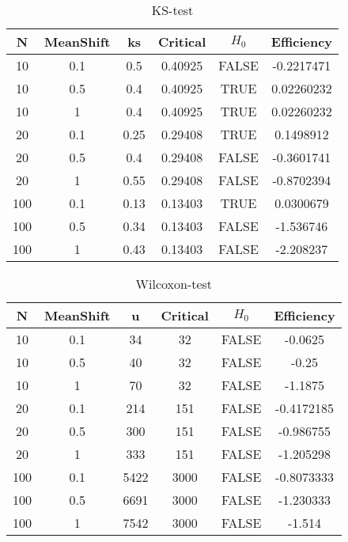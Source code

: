 \documentclass{article} %
\begin{document}
\begin{table}[H]
\centering
\begin{tabular}{|c|c|c|c|c|c|}
\hline
\textbf{N} & \textbf{MeanShift} & \textbf{ks} &
\textbf{Critical} & \textbf{$H_0$} & \textbf{Efficiency} \\ \hline
10  & 0.1       & 0.5  & 0.40925  & FALSE & -0.2217471 \\ \hline
10  & 0.5       & 0.4  & 0.40925  & TRUE  & 0.02260232 \\ \hline
10  & 1         & 0.4  & 0.40925  & TRUE  & 0.02260232 \\ \hline
20  & 0.1       & 0.25 & 0.29408  & TRUE  & 0.1498912  \\ \hline
20  & 0.5       & 0.4  & 0.29408  & FALSE & -0.3601741 \\ \hline
20  & 1         & 0.55 & 0.29408  & FALSE & -0.8702394 \\ \hline
100 & 0.1       & 0.13 & 0.13403  & TRUE  & 0.0300679  \\ \hline
100 & 0.5       & 0.34 & 0.13403  & FALSE & -1.536746  \\ \hline
100 & 1         & 0.43 & 0.13403  & FALSE & -2.208237  \\ \hline
\end{tabular}
\caption{KS-test}
\end{table}

\begin{table}[H]
\centering
\begin{tabular}{|c|c|c|c|c|c|}
\hline
\textbf{N} & \textbf{MeanShift} & \textbf{u} &
\textbf{Critical} & \textbf{$H_0$} & \textbf{Efficiency} \\ \hline
10  & 0.1       & 34   & 32       & FALSE & -0.0625    \\ \hline
10  & 0.5       & 40   & 32       & FALSE & -0.25      \\ \hline
10  & 1         & 70   & 32       & FALSE & -1.1875    \\ \hline
20  & 0.1       & 214  & 151      & FALSE & -0.4172185 \\ \hline
20  & 0.5       & 300  & 151      & FALSE & -0.986755  \\ \hline
20  & 1         & 333  & 151      & FALSE & -1.205298  \\ \hline
100 & 0.1       & 5422 & 3000     & FALSE & -0.8073333 \\ \hline
100 & 0.5       & 6691 & 3000     & FALSE & -1.230333  \\ \hline
100 & 1         & 7542 & 3000     & FALSE & -1.514     \\ \hline
\end{tabular}
\caption{Wilcoxon-test}
\end{table}
\end{document}
